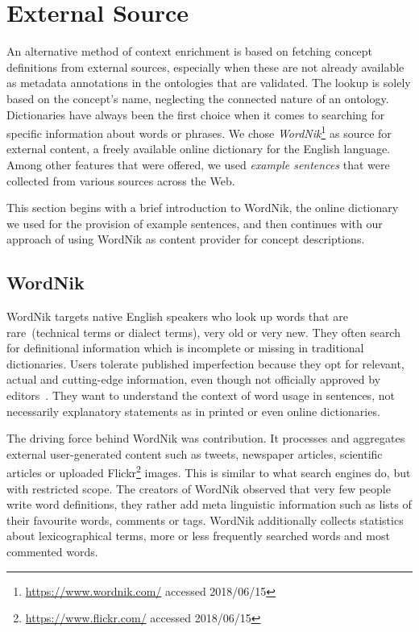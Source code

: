 \section{External Source}\label{sec:external_source}
An alternative method of context enrichment is based on fetching concept definitions from external sources, especially when these are not already available as metadata annotations in the ontologies that are validated. The lookup is solely based on the concept's name, neglecting the connected nature of an ontology. Dictionaries have always been the first choice when it comes to searching for specific information about words or phrases. We chose \textit{WordNik}\footnote{\url{https://www.wordnik.com/} accessed 2018/06/15} as source for external content, a freely available online dictionary for the English language. Among other features that were offered, we used \emph{example sentences} that were collected from various sources across the Web. 

This section begins with a brief introduction to WordNik, the online dictionary we used for the provision of example sentences, and then continues with our approach of using WordNik as content provider for concept descriptions.   


\subsection{WordNik}\label{sec:wordnik}
WordNik targets native English speakers who look up words that are rare~(technical terms or dialect terms), very old or very new. They often search for definitional information which is incomplete or missing in traditional dictionaries. Users tolerate published imperfection because they opt for relevant, actual and cutting-edge information, even though not officially approved by editors~\cite{burnett1979}. They want to understand the context of word usage in sentences, not necessarily explanatory statements as in printed or even online dictionaries.

The driving force behind WordNik was contribution. It processes and aggregates external user-generated content such as tweets, newspaper articles, scientific articles or uploaded Flickr\footnote{\url{https://www.flickr.com/} accessed 2018/06/15} images. This is similar to what search engines do, but with restricted scope. The creators of WordNik observed that very few people write word definitions, they rather add meta linguistic information such as lists of their favourite words, comments or tags. WordNik additionally collects statistics about lexicographical terms, more or less frequently searched words and most commented words. 

